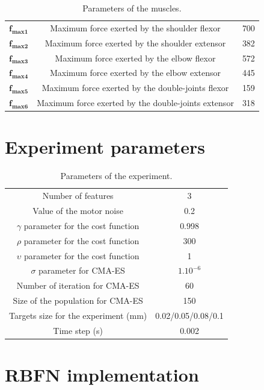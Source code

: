 \documentclass[pdftex,a4paper,11pt]{report}
\begin{document}
\begin{table}[hbt]
\caption{Parameters of the muscles.}
\begin{center}
\begin{tabular}{|c|c|c|}
\hline  
$\textbf{f}_{\textbf{max1}}$ & Maximum force exerted by the shoulder flexor & 700\\
$\textbf{f}_{\textbf{max2}}$ & Maximum force exerted by the shoulder extensor & 382\\
$\textbf{f}_{\textbf{max3}}$ & Maximum force exerted by the elbow flexor & 572\\
$\textbf{f}_{\textbf{max4}}$ & Maximum force exerted by the elbow extensor & 445\\
$\textbf{f}_{\textbf{max5}}$ & Maximum force exerted by the double-joints flexor & 159\\
$\textbf{f}_{\textbf{max6}}$ & Maximum force exerted by the double-joints extensor & 318\\
\hline
\end{tabular}
\end{center}
\label{MuscleParamTable}
\end{table}

\pagebreak
\section{Experiment parameters}
\begin{table}[hbt]
\caption{Parameters of the experiment.}
\begin{center}
\begin{tabular}{|c|c|}
\hline  
Number of features & 3\\
Value of the motor noise & 0.2\\
$\gamma$ parameter for the cost function & 0.998\\
$\rho$ parameter for the cost function & 300\\
$\upsilon$ parameter for the cost function & 1\\
$\sigma$ parameter for CMA-ES & $1.10^{-6}$\\
Number of iteration for CMA-ES & 60 \\
Size of the population for CMA-ES & 150 \\
Targets size for the experiment (mm) & 0.02/0.05/0.08/0.1 \\
Time step (s) & 0.002 \\
\hline
\end{tabular}
\end{center}
\label{ExperimentParam}
\end{table}

\pagebreak

\section{RBFN implementation}
\label{sec_rbfnCode}




\end{document}
